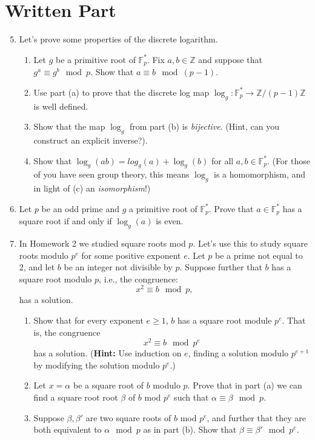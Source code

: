 \documentclass[11pt]{article}
\newcommand{\bF}{\mathbb{F}}
\newcommand{\bZ}{\mathbb{Z}}
\begin{document}
\section*{Written Part}
\begin{enumerate}
  \setcounter{enumi}{4}
  \item{
  Let's prove some properties of the discrete logarithm.
  \begin{enumerate}
    \item{
    Let $g$ be a primitive root of $\bF_p^*$.  Fix $a,b\in\bZ$ and suppose that $g^a\equiv g^b\mod p$.  Show that $a\equiv b\mod(p-1)$.
    }
    \item{
    Use part (a) to prove that the discrete log map $\log_g:\bF_p^*\longrightarrow\bZ/(p-1)\bZ$ is well defined.
    }
    \item{
    Show that the map $\log_g$ from part (b) is \textit{bijective}.  (Hint, can you construct an explicit inverse?).
    }
    \item{
    Show that $\log_g(ab) = log_g(a)+\log_g(b)$ for all $a,b\in\bF_p^*$.  (For those of you have seen group theory, this means $\log_g$ is a homomorphism, and in light of (c) an \textit{isomorphism}!)
    }
  \end{enumerate}
  }
  \item{
  Let $p$ be an odd prime and $g$ a primitive root of $\bF_p^*$.  Prove that $a\in\bF_p^*$ has a square root if and only if $\log_g(a)$ is even.
  }
  \item{
  In Homework 2 we studied square roots mod $p$.  Let's use this to study square roots modulo $p^e$ for some positive exponent $e$.  Let $p$ be a prime not equal to 2, and let $b$ be an integer not divisible by $p$.  Suppose further that $b$ has a square root modulo $p$, i.e., the congruence:
  \[x^2\equiv b\mod p,\]
  has a solution.
  \begin{enumerate}
    \item{
    Show that for every exponent $e\ge 1$, $b$ has a square root module $p^e$.  That is, the congruence
    \[x^2\equiv b\mod p^e\]
    has a solution.  (\textbf{Hint:} Use induction on $e$, finding a solution modulo $p^{e+1}$ by modifying the solution modulo $p^e$.)
    }
    \item{
    Let $x=\alpha$ be a square root of $b$ modulo $p$.  Prove that in part (a) we can find a square root root $\beta$ of $b$ mod $p^e$ such that $\alpha\equiv\beta\mod p$.
    }
    \item{
    Suppose $\beta,\beta'$ are two square roots of $b$ mod $p^e$, and further that they are both equivalent to $\alpha\mod p$ as in part (b).  Show that $\beta\equiv\beta'\mod p^e$.
}
\end{enumerate}}
\end{enumerate}
\end{document}
